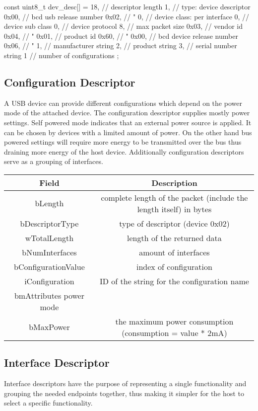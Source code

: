 \begin{verbatim*}
 const uint8_t dev_desc[] = {
	18,     // descriptor length
	1,      // type: device descriptor
	0x00,   // bcd usb release number
	0x02,   //  "
	0,      // device class: per interface
	0,      // device sub class
	0,      // device protocol
	8,     // max packet size
	0x03,   // vendor id
	0x04,   //  "
	0x01,   // product id
	0x60,   //  "
	0x00,   // bcd device release number
	0x06,   //  "
	1,      // manufacturer string
	2,      // product string
	3,      // serial number string
	1       // number of configurations
};
\end{verbatim*}
\subsection{Configuration Descriptor}
A USB device can provide different configurations which depend on the power mode of the attached device. The configuration descriptor supplies mostly 
power settings. Self powered mode indicates that an external power source is applied. It can be chosen by devices with a limited amount of power. On 
the other hand bus powered settings will require more energy to be transmitted over the bus thus draining more energy of the host device. Additionally 
configuration descriptors serve as a grouping of interfaces.

\begin{tabular}{c|c}
Field & Description \\ \hline
bLength & complete length of the packet (include the length itself) in bytes \\
bDescriptorType & type of descriptor (device 0x02)\\
wTotalLength & length of the returned data \\
bNumInterfaces & amount of interfaces\\
bConfigurationValue & index of configuration \\
iConfiguration & ID of the string for the configuration name\\
bmAttributes  power mode\\
bMaxPower & the maximum power consumption (consumption = value * 2mA) \\
\end{tabular}

\subsection{Interface Descriptor}
Interface descriptors have the purpose of representing a single functionality and grouping the needed endpoints together, thus making 
it simpler for the host to select a specific functionality.

